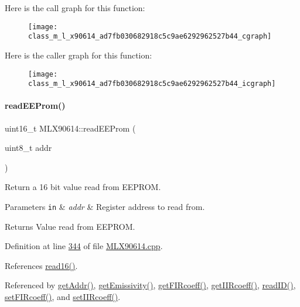 Here is the call graph for this function\+:\nopagebreak
\begin{figure}[H]
\begin{center}
\leavevmode
\texttt{[image: class\_m\_l\_x90614\_ad7fb030682918c5c9ae6292962527b44\_cgraph]}
\end{center}
\end{figure}
Here is the caller graph for this function\+:\nopagebreak
\begin{figure}[H]
\begin{center}
\leavevmode
\texttt{[image: class\_m\_l\_x90614\_ad7fb030682918c5c9ae6292962527b44\_icgraph]}
\end{center}
\end{figure}
\mbox{\label{class_m_l_x90614_aab0a010875527f4ac3d2794017624b10}} 
\paragraph{\texorpdfstring{read\+E\+E\+Prom()}{readEEProm()}}
{\footnotesize\ttfamily uint16\+\_\+t M\+L\+X90614\+::read\+E\+E\+Prom (\begin{DoxyParamCaption}\item[{uint8\+\_\+t}]{addr }\end{DoxyParamCaption})}



Return a 16 bit value read from E\+E\+P\+R\+OM. 


\begin{DoxyParams}[1]{Parameters}
\mbox{\tt in}  & {\em addr} & Register address to read from. \\
\hline
\end{DoxyParams}
\begin{DoxyReturn}{Returns}
Value read from E\+E\+P\+R\+OM. 
\end{DoxyReturn}


Definition at line \mbox{\hyperlink{_m_l_x90614_8cpp_source_l00344}{344}} of file \mbox{\hyperlink{_m_l_x90614_8cpp_source}{M\+L\+X90614.\+cpp}}.



References \mbox{\hyperlink{_m_l_x90614_8cpp_source_l00270}{read16()}}.



Referenced by \mbox{\hyperlink{_m_l_x90614_8cpp_source_l00250}{get\+Addr()}}, \mbox{\hyperlink{_m_l_x90614_8cpp_source_l00120}{get\+Emissivity()}}, \mbox{\hyperlink{_m_l_x90614_8cpp_source_l00208}{get\+F\+I\+Rcoeff()}}, \mbox{\hyperlink{_m_l_x90614_8cpp_source_l00166}{get\+I\+I\+Rcoeff()}}, \mbox{\hyperlink{_m_l_x90614_8cpp_source_l00395}{read\+I\+D()}}, \mbox{\hyperlink{_m_l_x90614_8cpp_source_l00184}{set\+F\+I\+Rcoeff()}}, and \mbox{\hyperlink{_m_l_x90614_8cpp_source_l00143}{set\+I\+I\+Rcoeff()}}.


